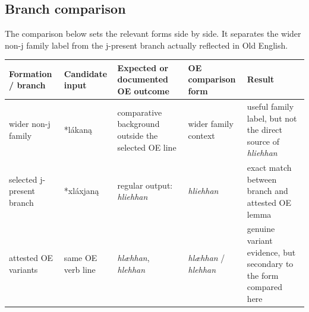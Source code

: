 \documentclass[
  british,
  a4paper,
  openany]{book}
\newcounter{none} %
\begin{document}
\subsection{Branch comparison}\label{branch-comparison}

The comparison below sets the relevant forms side by side. It separates
the wider non-j family label from the j-present branch actually
reflected in Old English.

{\def\LTcaptype{none} %
\begin{longtable}[]{@{}
  >{\raggedright\arraybackslash}p{}
  >{\raggedright\arraybackslash}p{}
  >{\raggedright\arraybackslash}p{}
  >{\raggedright\arraybackslash}p{}
  >{\raggedright\arraybackslash}p{}@{}}
\toprule\noalign{}
\begin{minipage}[b]{\linewidth}\raggedright
Formation / branch
\end{minipage} & \begin{minipage}[b]{\linewidth}\raggedright
Candidate input
\end{minipage} & \begin{minipage}[b]{\linewidth}\raggedright
Expected or documented OE outcome
\end{minipage} & \begin{minipage}[b]{\linewidth}\raggedright
OE comparison form
\end{minipage} & \begin{minipage}[b]{\linewidth}\raggedright
Result
\end{minipage} \\
\midrule\noalign{}
\endhead
\bottomrule\noalign{}
\endlastfoot
wider non-j family & *lákaną & comparative background outside the
selected OE line & wider family context & useful family label, but not
the direct source of \emph{hliehhan} \\
selected j-present branch & *xláxjaną & regular output: \emph{hliehhan}
& \emph{hliehhan} & exact match between branch and attested OE lemma \\
attested OE variants & same OE verb line & \emph{hlæhhan},
\emph{hlehhan} & \emph{hlæhhan} / \emph{hlehhan} & genuine variant
evidence, but secondary to the form compared here \\
\end{longtable}
}
\end{document}
